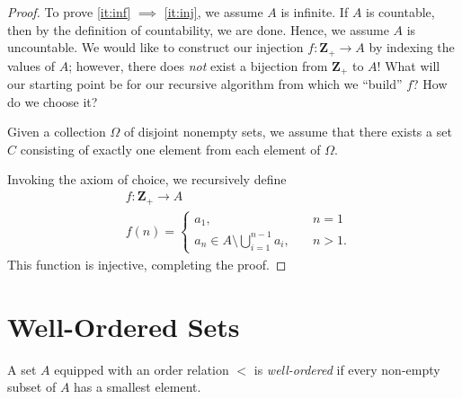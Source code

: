 \begin{proof}
To prove \cref{it:inf} $\implies$ \cref{it:inj}, we assume $A$ is infinite.
If $A$ is countable, then by the definition of countability, we are done.
Hence, we assume $A$ is uncountable. We would like to construct our injection
$f: \mathbf{Z}_{+} \to A$ by indexing the values of $A$; however, there does
\emph{not} exist a bijection from $\mathbf{Z}_{+}$ to $A$! What will our starting
point be for our recursive algorithm from which we ``build'' $f$? How do we
choose it?
\begin{remark}
Given a collection $\Omega$ of disjoint nonempty sets, we assume that there exists a set $C$ consisting of exactly one element from each element of $\Omega$.
\end{remark} Invoking the axiom of choice, we recursively define
\begin{equation*}
\begin{split}
& f: \mathbf{Z}_{+} \to A \\
& f(n) = \begin{cases}
a_{1}, & \quad n = 1 \\
a_{n} \in A \setminus
\bigcup_{i=1}^{n-1} a_{i}, & \quad n > 1.\end{cases}
\end{split}
\end{equation*}
This function is injective, completing the proof.
\end{proof}
\section{Well-Ordered Sets}
\begin{definition}
A set $A$ equipped with an order relation $<$ is \emph{well-ordered}
if every non-empty subset of $A$ has a smallest element.
\label{def:well-ordered}
\end{definition}

